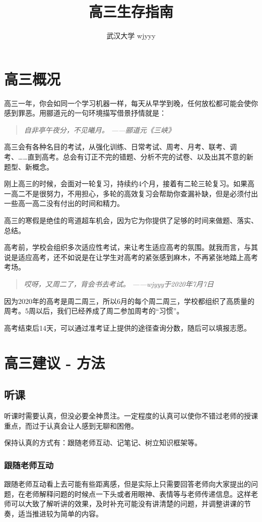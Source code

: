 \documentclass[UTF8,11pt,a4paper]{ctexart}
\title{\textbf{高三生存指南}}
\author{武汉大学 wjyyy}
\begin{document}
	\maketitle
	\tableofcontents
	\section{高三概况}
		高三一年，你会如同一个学习机器一样，每天从早学到晚，任何放松都可能会使你感到罪恶。用郦道元的一句环境描写借景抒情就是：
		\begin{quote}
			\textit{自非亭午夜分，不见曦月。}
			\flushright\textit{——郦道元《三峡》}
		\end{quote}
		
		高三会有各种名目的考试，从强化训练、日常考试、周考、月考、联考、调考、……直到高考。总会有订正不完的错题、分析不完的试卷、以及出其不意的新题型、新概念。
		
		刚上高三的时候，会面对一轮复习，持续约4个月，接着有二轮三轮复习。如果高一高二不是很努力，不用担心，多轮的高效复习会帮助你查漏补缺，但是必须付出一些高一高二没有付出的时间和精力。
		
		高三的寒假是绝佳的弯道超车机会，因为它为你提供了足够的时间来做题、落实、总结。
		
		高考前，学校会组织多次适应性考试，来让考生适应高考的氛围。就我而言，与其说是适应高考，还不如说是在让学生对高考的紧张感到麻木，不再紧张地踏上高考考场。
		
		\begin{quote}
			\textit{哎呀，又周二了，背会书去考试。}
			\flushright\textit{——wjyyy于2020年7月7日}
		\end{quote}
	
		因为2020年的高考是周二周三，所以6月的每个周二周三，学校都组织了高质量的周考。5周以后，我们已经养成了周二参加周考的“习惯”。
		
		高考结束后14天，可以通过准考证上提供的途径查询分数，随后可以填报志愿。
	\section{高三建议 - 方法}
		\subsection{听课}
			听课时需要认真，但没必要全神贯注。一定程度的认真可以使你不错过老师的授课重点，而过于认真会让人感到无聊和困倦。
			
			保持认真的方式有：跟随老师互动、记笔记、树立知识框架等。
			\subsubsection{跟随老师互动}
				跟随老师互动看上去可能有些距离感，但是实际上只需要回答老师向大家提出的问题，在老师解释问题的时候点一下头或者用眼神、表情等与老师传递信息。这样老师可以大致了解听讲的效果，及时补充可能没有讲清楚的问题，并调整讲课的节奏，适当推进较为简单的内容。
				
\end{document}
